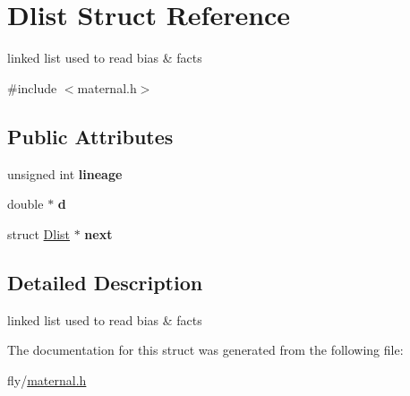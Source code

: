 \hypertarget{structDlist}{
\section{Dlist Struct Reference}
\label{structDlist}
}


linked list used to read bias \& facts  


{\ttfamily \#include $<$maternal.h$>$}\subsection*{Public Attributes}
\begin{DoxyCompactItemize}
\item 
\hypertarget{structDlist_a90b4d40f512be2cf6998e98f669dc4e6}{
unsigned int {\bfseries lineage}}
\label{structDlist_a90b4d40f512be2cf6998e98f669dc4e6}

\item 
\hypertarget{structDlist_a0cfbfb9a738771e9198080d0554bfe55}{
double $\ast$ {\bfseries d}}
\label{structDlist_a0cfbfb9a738771e9198080d0554bfe55}

\item 
\hypertarget{structDlist_a52edbb6900239cd925e55aff3c534372}{
struct \hyperlink{structDlist}{Dlist} $\ast$ {\bfseries next}}
\label{structDlist_a52edbb6900239cd925e55aff3c534372}

\end{DoxyCompactItemize}


\subsection{Detailed Description}
linked list used to read bias \& facts 

The documentation for this struct was generated from the following file:\begin{DoxyCompactItemize}
\item 
fly/\hyperlink{maternal_8h}{maternal.h}\end{DoxyCompactItemize}

